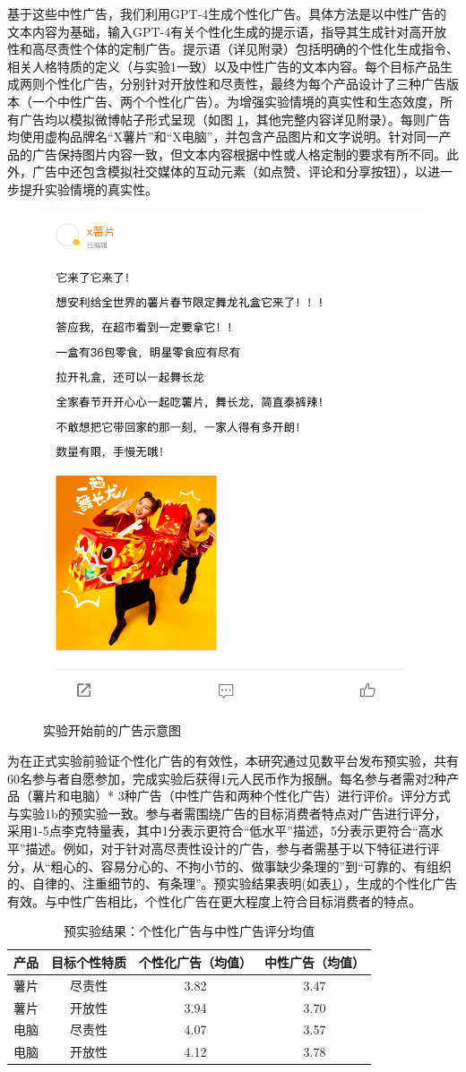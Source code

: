 基于这些中性广告，我们利用GPT-4生成个性化广告。具体方法是以中性广告的文本内容为基础，输入GPT-4有关个性化生成的提示语，指导其生成针对高开放性和高尽责性个体的定制广告。提示语（详见附录）包括明确的个性化生成指令、相关人格特质的定义（与实验1一致）以及中性广告的文本内容。每个目标产品生成两则个性化广告，分别针对开放性和尽责性，最终为每个产品设计了三种广告版本（一个中性广告、两个个性化广告）。为增强实验情境的真实性和生态效度，所有广告均以模拟微博帖子形式呈现（如图 \ref{fig:Study1-exp2-ads}，其他完整内容详见附录）。每则广告均使用虚构品牌名“X薯片”和“X电脑”，并包含产品图片和文字说明。针对同一产品的广告保持图片内容一致，但文本内容根据中性或人格定制的要求有所不同。此外，广告中还包含模拟社交媒体的互动元素（如点赞、评论和分享按钮），以进一步提升实验情境的真实性。

\begin{figure}[H]
    \centering
    \includegraphics[width=.3\linewidth]{Image/Study1-exp2-ads.png}
    \caption{\label{fig:Study1-exp2-ads}实验开始前的广告示意图}
\end{figure}

为在正式实验前验证个性化广告的有效性，本研究通过见数平台发布预实验，共有60名参与者自愿参加，完成实验后获得1元人民币作为报酬。每名参与者需对2种产品（薯片和电脑）* 3种广告（中性广告和两种个性化广告）进行评价。评分方式与实验1b的预实验一致。参与者需围绕广告的目标消费者特点对广告进行评分，采用1-5点李克特量表，其中1分表示更符合“低水平”描述，5分表示更符合“高水平”描述。例如，对于针对高尽责性设计的广告，参与者需基于以下特征进行评分，从“粗心的、容易分心的、不拘小节的、做事缺少条理的”到“可靠的、有组织的、自律的、注重细节的、有条理”。预实验结果表明(如表\ref{tab:study1-exp2-pretest-results}），生成的个性化广告有效。与中性广告相比，个性化广告在更大程度上符合目标消费者的特点。

\begin{table}[H]
    \centering
    \caption{\label{tab:study1-exp2-pretest-results} 预实验结果：个性化广告与中性广告评分均值}
    {\tablesongti %
    \renewcommand{\arraystretch}{1} %
    \begin{tabular}{l c c c}
        \toprule
        \textbf{产品} & \textbf{目标个性特质} & \textbf{个性化广告（均值）} & \textbf{中性广告（均值）} \\
        \midrule
        薯片 & 尽责性 & 3.82 & 3.47 \\
        薯片 & 开放性 & 3.94 & 3.70 \\
        电脑 & 尽责性 & 4.07 & 3.57 \\
        电脑 & 开放性 & 4.12 & 3.78 \\
        \bottomrule
    \end{tabular}
    }
\end{table}


